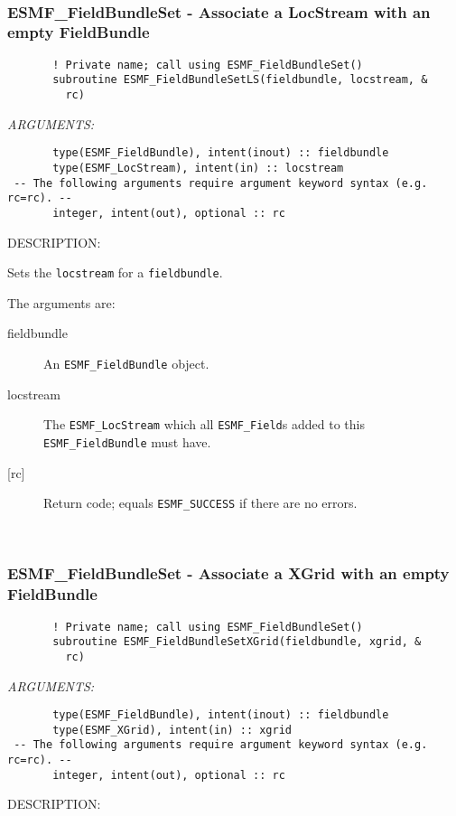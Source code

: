    
 
\mbox{}\hrulefill\ 
 
\subsubsection [ESMF\_FieldBundleSet] {ESMF\_FieldBundleSet - Associate a LocStream with an empty FieldBundle}


  
\begin{verbatim}       ! Private name; call using ESMF_FieldBundleSet()
       subroutine ESMF_FieldBundleSetLS(fieldbundle, locstream, &
         rc)\end{verbatim}{\em ARGUMENTS:}
\begin{verbatim}       type(ESMF_FieldBundle), intent(inout) :: fieldbundle
       type(ESMF_LocStream), intent(in) :: locstream
 -- The following arguments require argument keyword syntax (e.g. rc=rc). --
       integer, intent(out), optional :: rc\end{verbatim}
{\sf DESCRIPTION:\\ }


   \begin{sloppypar}
   Sets the {\tt locstream} for a {\tt fieldbundle}.
   \end{sloppypar}
  
   The arguments are:
   \begin{description}
   \item [fieldbundle]
   An {\tt ESMF\_FieldBundle} object.
   \item [locstream]
   The {\tt ESMF\_LocStream} which all {\tt ESMF\_Field}s added to this
   {\tt ESMF\_FieldBundle} must have.
   \item [{[rc]}]
   Return code; equals {\tt ESMF\_SUCCESS} if there are no errors.
   \end{description}
  
   
 
\mbox{}\hrulefill\ 
 
\subsubsection [ESMF\_FieldBundleSet] {ESMF\_FieldBundleSet - Associate a XGrid with an empty FieldBundle}


  
\begin{verbatim}       ! Private name; call using ESMF_FieldBundleSet()
       subroutine ESMF_FieldBundleSetXGrid(fieldbundle, xgrid, &
         rc)\end{verbatim}{\em ARGUMENTS:}
\begin{verbatim}       type(ESMF_FieldBundle), intent(inout) :: fieldbundle
       type(ESMF_XGrid), intent(in) :: xgrid
 -- The following arguments require argument keyword syntax (e.g. rc=rc). --
       integer, intent(out), optional :: rc\end{verbatim}
{\sf DESCRIPTION:\\ }


